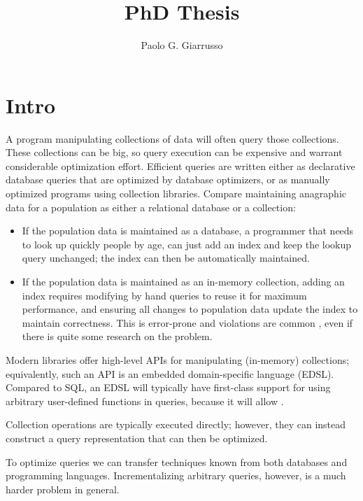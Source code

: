 \documentclass{book}
\title{PhD Thesis}
\author{Paolo G. Giarrusso}
\begin{document}
\maketitle
\chapter{Intro}

A program manipulating collections of data will often query those
collections.
These collections can be big, so query execution can be expensive
and warrant considerable optimization effort.
Efficient queries are written either as declarative database queries that are
optimized by database optimizers, or as manually optimized programs using
collection libraries. Compare maintaining anagraphic data for a population
as either a relational database or a collection:
\begin{itemize}
\item If the population data is maintained as a database, a programmer that needs to
  look up quickly people by age, can just add an index and keep the lookup query
  unchanged; the index can then be automatically maintained.
\item If the population data is maintained as an in-memory collection, adding an
  index requires modifying by hand queries to reuse it for maximum performance,
  and ensuring all changes to population data update the index to maintain
  correctness. This is error-prone and violations are common , even if
  there is quite some research on the problem.
\end{itemize}
Modern libraries offer high-level APIs for manipulating (in-memory) collections;
equivalently, such an API is an embedded domain-specific language (EDSL).
Compared to SQL, an EDSL will typically have first-class support for using
arbitrary user-defined functions in queries, because it will allow .


Collection operations are typically executed directly; however, they can instead
construct a query representation that can then be optimized.

To optimize queries we can transfer techniques known from both databases and
programming languages. Incrementalizing arbitrary queries, however, is a much
harder problem in general.
\end{document}
